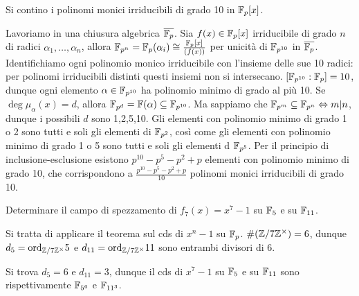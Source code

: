 \begin{exercise}
    Si contino i polinomi monici irriducibili di grado 10 in $\mathbb{F}_p[x]$.
\end{exercise}
\begin{solution}
    Lavoriamo in una chiusura algebrica $\overline{{\mathbb{F}_p}}$. Sia $f(x) \in \mathbb{F}_p[x]$ irriducibile di grado $n$ di radici $\alpha_1, \dots, \alpha_n$, allora $\mathbb{F}_{p^n} = \mathbb{F}_p(\alpha_i) \cong \frac{\mathbb{F}_p[x]}{(f(x))}$ per unicità di $\mathbb{F}_{p^{10}}$ in $\overline{\mathbb{F}_p}$. Identifichiamo ogni polinomio monico irriducibile con l'insieme delle sue 10 radici: per polinomi irriducibili distinti questi insiemi non si intersecano. $[\mathbb{F}_{p^{10}} : \mathbb{F}_p] = 10$, dunque ogni elemento $\alpha \in \mathbb{F}_{p^{10}}$ ha polinomio minimo di grado al più 10. Se $\deg \mu_\alpha(x) = d$, allora $\mathbb{F}_{p^d} = \mathbb{F}(\alpha) \subseteq \mathbb{F}_{p^{10}}$. Ma sappiamo che $\mathbb{F}_{p^m} \subseteq \mathbb{F}_{p^n} \Leftrightarrow m | n$, dunque i possibili $d$ sono 1,2,5,10. Gli elementi con polinomio minimo di grado 1 o 2 sono tutti e soli gli elementi di $\mathbb{F}_{p^2}$, così come gli elementi con polinomio minimo di grado 1 o 5 sono tutti e soli gli elementi d $\mathbb{F}_{p^5}$. Per il principio di inclusione-esclusione esistono $p^{10} - p^5 - p^2 + p$ elementi con polinomio minimo di grado 10, che corrispondono a $\frac{p^{10} - p^5 - p^2 + p}{10}$ polinomi monici irriducibili di grado 10.
\end{solution}

\begin{exercise}
    Determinare il campo di spezzamento di $f_7(x) = x^7 - 1$ su $\mathbb{F}_5$ e su $\mathbb{F}_{11}$.
\end{exercise}
\begin{solution}
    Si tratta di applicare il teorema sul cds di $x^n - 1$ su $\mathbb{F}_p$.
    $\#(\mathbb{Z}/7\mathbb{Z}^\times) = 6$, dunque $d_5 = \text{ord}_{\mathbb{Z}/7\mathbb{Z}^\times} 5$ e $d_{11} = \text{ord}_{\mathbb{Z}/7\mathbb{Z}^\times} 11$ sono entrambi divisori di 6.

    Si trova $d_5 = 6$ e $d_{11} = 3$, dunque il cds di $x^7 - 1$ su $\mathbb{F}_5$ e su $\mathbb{F}_{11}$ sono rispettivamente $\mathbb{F}_{5^6}$ e $\mathbb{F}_{{11}^3}$.
\end{solution}

